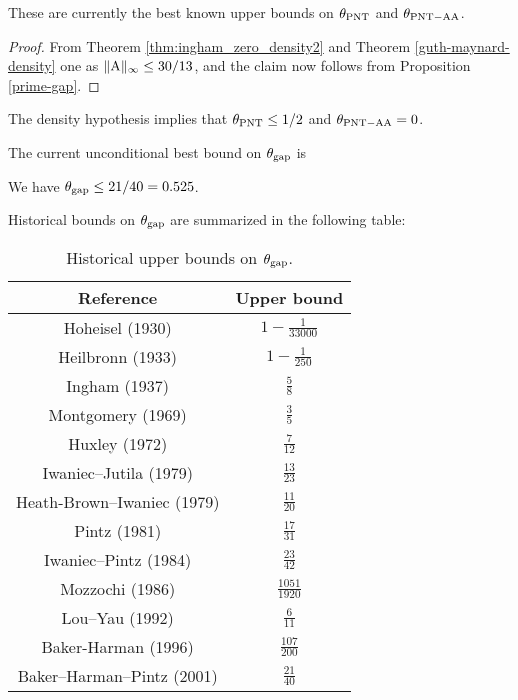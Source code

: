 These are currently the best known upper bounds on $\theta_{\mathrm{PNT}}$ and $\theta_{\mathrm{PNT-AA}}$.

\begin{proof}  From Theorem \ref{thm:ingham_zero_density2} and Theorem \ref{guth-maynard-density} one as $\|\mathrm{A}\|_\infty \leq 30/13$, and the claim now follows from Proposition \ref{prime-gap}.
\end{proof}

\begin{corollary}  The density hypothesis implies that $\theta_{\mathrm{PNT}} \leq 1/2$ and $\theta_{\mathrm{PNT-AA}} = 0$.
\end{corollary}

The current unconditional best bound on $\theta_{\mathrm{gap}}$ is

\begin{theorem}\label{bhp-thm}\cite{baker-harman-pintz} We have $\theta_{\mathrm{gap}} \leq 21/40= 0.525$.
\end{theorem}

Historical bounds on $\theta_{\mathrm{gap}}$ are summarized in the following table:

\begin{table}[ht]
    \caption{Historical upper bounds on $\theta_{\mathrm{gap}}$.}
    \centering
    \renewcommand{\arraystretch}{1.2}
    \begin{tabular}{|c|c|}
    \hline
    Reference & Upper bound \\
    \hline
    Hoheisel (1930) \cite{hoheisel_1930} & $1 - \frac{1}{33000}$ \\
    \hline
    Heilbronn (1933) \cite{heilbronn_1933} & $1 - \frac{1}{250}$ \\
    \hline
    Ingham (1937) \cite{ingham_difference_1937} & $\frac{5}{8}$ \\
    \hline
    Montgomery (1969) \cite{montgomery_1969} & $\frac{3}{5}$ \\
    \hline
    Huxley (1972) \cite{Huxley} & $\frac{7}{12}$ \\
    \hline
    Iwaniec--Jutila (1979)\cite{iwaniec-jutila} & $\frac{13}{23}$ \\
    \hline
    Heath-Brown--Iwaniec (1979) \cite{heathbrown_iwaniec_1979} & $\frac{11}{20}$ \\
    \hline
    Pintz (1981) \cite{pintz_1981} & $\frac{17}{31}$ \\
    \hline
    Iwaniec--Pintz (1984) \cite{iwaniec-pintz} & $\frac{23}{42}$\\
    \hline
    Mozzochi (1986) & $\frac{1051}{1920}$ \\
    \hline
    Lou--Yau (1992)  & $\frac{6}{11}$\\
    \hline
    Baker-Harman (1996) & $\frac{107}{200}$\\
    \hline
    Baker--Harman--Pintz (2001) \cite{baker-harman-pintz} & $\frac{21}{40}$ \\
    \hline
    \end{tabular}
    \end{table}\label{gapmax-table}

